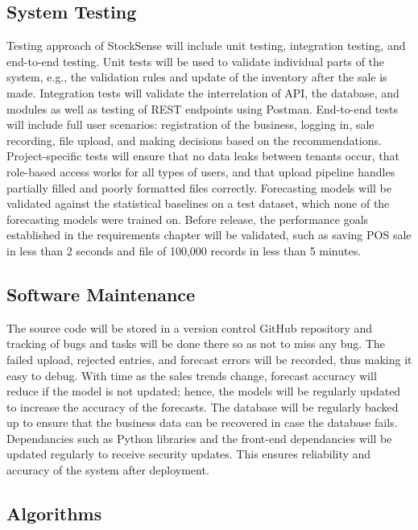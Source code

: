 \documentclass{StockSense}
\begin{document}
\subsection{System Testing}

Testing approach of StockSense will include unit testing, integration testing, and end-to-end testing. Unit tests will be used to validate individual parts of the system, e.g., the validation rules and update of the inventory after the sale is made. Integration tests will validate the interrelation of API, the database, and modules as well as testing of REST endpoints using Postman. End-to-end tests will include full user scenarios: registration of the business, logging in, sale recording, file upload, and making decisions based on the recommendations. Project-specific tests will ensure that no data leaks between tenants occur, that role-based access works for all types of users, and that upload pipeline handles partially filled and poorly formatted files correctly. Forecasting models will be validated against the statistical baselines on a test dataset, which none of the forecasting models were trained on. Before release, the performance goals established in the requirements chapter will be validated, such as saving POS sale in less than 2 seconds and file of 100,000 records in less than 5 minutes.

\subsection{Software Maintenance}

The source code will be stored in a version control GitHub repository and tracking of bugs and tasks will be done there so as not to miss any bug. The failed upload, rejected entries, and forecast errors will be recorded, thus making it easy to debug. With time as the sales trends change, forecast accuracy will reduce if the model is not updated; hence, the models will be regularly updated to increase the accuracy of the forecasts. The database will be regularly backed up to ensure that the business data can be recovered in case the database fails. Dependancies such as Python libraries and the front-end dependancies will be updated regularly to receive security updates. This ensures reliability and accuracy of the system after deployment.

\subsection{Algorithms}
\end{document}
